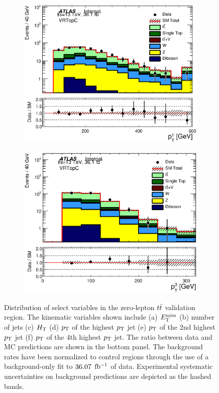 \begin{figure}[h!]
\begin{center}
\begin{subfigure}[b]{0.40\textwidth}
    	 \includegraphics[width=\textwidth]{figures/plotRegion/JetPt_1__VRTopC_log.eps}
                \caption{ }
    \end{subfigure}
    \begin{subfigure}[b]{0.40\textwidth}    
    	 \includegraphics[width=\textwidth]{figures/plotRegion/JetPt_3__VRTopC_log.eps}
               \caption{ }
    \end{subfigure}
     \caption[Distribution of select variables in the zero-lepton $\ttbar$ validation region]{ Distribution of select variables in the zero-lepton $\ttbar$ validation region.  The kinematic variables shown include (a) $E_{\mathrm{T}}^{\mathrm{miss}}$ (b) number of jets (c) $H_{\mathrm{T}}$ (d) $p_{\mathrm{T}}$ of the highest $p_{\mathrm{T}}$ jet (e) $p_{\mathrm{T}}$ of the 2nd highest $p_{\mathrm{T}}$ jet (f) $p_{\mathrm{T}}$ of the 4th highest $p_{\mathrm{T}}$ jet.  The ratio between data and MC predictions are shown in the bottom panel.  The background rates have been normalized to control regions through the use of a background-only fit to $36.07$ $\mbox{fb$^{-1}$}$ of data.  Experimental systematic uncertainties on background predictions are depicted as the hashed bands.  }
  \label{fig:VRTopC1}
    \end{center}
\end{figure}

